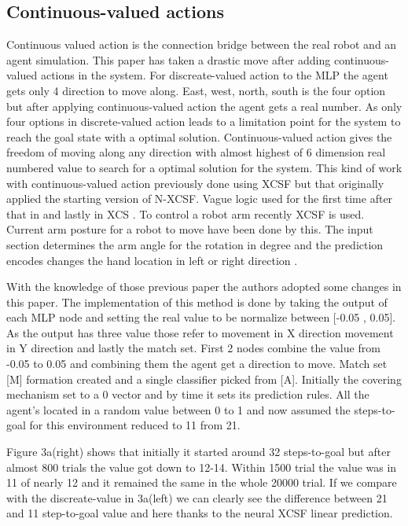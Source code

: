 \documentclass[12pt]{article}
\begin{document}
\subsection{Continuous-valued actions}
\label{sec:verify}
Continuous valued action is the connection bridge between the real robot and an agent simulation. This paper has taken a drastic move after adding continuous-valued actions in the system. For discreate-valued action to the MLP the agent gets only 4 direction to move along. East, west, north, south is the four option but after applying continuous-valued action the agent gets a real number. As only four options in discrete-valued action leads to a limitation point for the system to reach the goal state with a optimal solution. Continuous-valued action gives the freedom of moving along any direction with almost highest of 6 dimension real numbered value to search for a optimal solution for the system. This kind of work with continuous-valued action previously done using XCSF but that originally applied \cite{WilsonPrediction2001FunctionAW} the starting version of N-XCSF. Vague logic used for the first time \cite{10.11415/1276958.1277327} after that in \cite{10.1007/3-540-45027-0_5} and lastly in XCS \cite{4286961}. To control a robot arm recently \cite{10.1145/1389095.1389360} XCSF is used. Current arm posture for a robot to move have been done by this. The input section determines the arm angle for the rotation in degree and the prediction encodes changes the hand location in left or right direction \cite{349978}. 

With the knowledge of those previous paper the authors adopted some changes in this paper. The implementation of this method is done by taking the output of each MLP node and setting the real value to be normalize between [-0.05 , 0.05]. As the output has three value those refer to movement in X direction movement in Y direction and lastly the match set. First 2 nodes combine the value from -0.05 to 0.05 and combining them the agent get a direction to move. Match set [M] formation created and a single classifier picked from [A]. Initially the covering mechanism set to a 0 vector and by time it sets its prediction rules. All the agent’s located in a random value between 0 to 1 and now assumed the steps-to-goal for this environment reduced to 11 from 21.

Figure 3a(right) shows that initially it started around 32 steps-to-goal but after almost 800 trials the value got down to 12-14. Within 1500 trial the value was in 11 of nearly 12 and it remained the same in the whole 20000 trial. If we compare with the discreate-value in 3a(left) we can clearly see the difference between 21 and 11 step-to-goal value and here thanks to the neural XCSF linear prediction.
\end{document}
